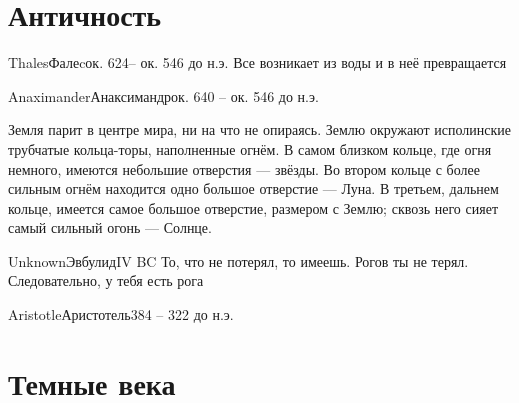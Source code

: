 \documentclass[aspectratio=169]{beamer}
\begin{document}
\section{Античность}

\begin{Person}{Thales}{Фалеc}{ок. 624-- ок. 546 до н.э.}
Все возникает из воды и в неё превращается
\end{Person}

\begin{Person}{Anaximander}{Анаксимандр}{ок. 640 -- ок. 546 до н.э.}

Земля парит в центре мира, ни на что не опираясь. Землю окружают исполинские трубчатые кольца-торы, наполненные огнём. В самом близком кольце, где огня немного, имеются небольшие отверстия — звёзды. Во втором кольце с более сильным огнём находится одно большое отверстие — Луна. В третьем, дальнем кольце, имеется самое большое отверстие, размером с Землю; сквозь него сияет самый сильный огонь — Солнце.
\end{Person}

\begin{Person}{Unknown}{Эвбулид}{IV BC}
То, что не потерял, то имеешь. Рогов ты не терял. Следовательно, у тебя есть рога
\end{Person}

\renewcommand{\ReasonWidth}{5cm}
\begin{Person}{Aristotle}{Аристотель}{384 -- 322 до н.э.}
\end{Person}


\section{Темные века}


\begin{frame}[plain]
\begin{center}
\end{center}
\end{frame}
\end{document}
